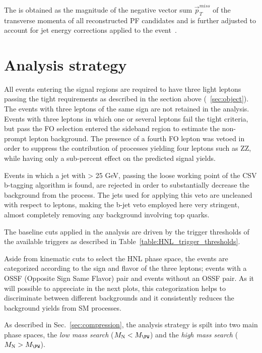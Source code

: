 
The \ptmiss is obtained as the magnitude of the negative vector sum $\overrightarrow{p}_{T}^{miss}$ of the transverse momenta of 
all reconstructed PF candidates and is further adjusted to account for jet energy corrections applied to the event~\cite{CMS-PAS-JME-16-004}.

\section{Analysis strategy}\label{sec:analisi}
All events entering the signal regions are required to have three light leptons passing the tight requirements as described in the section above (~\ref{sec:object}).
The events with three leptons of the same sign are not retained in the analysis. 
Events with three leptons in which one or several leptons fail the tight criteria, but pass the FO selection entered the sideband region to estimate the non-prompt lepton background. The presence of a fourth FO lepton was vetoed in order to suppress the contribution of processes yielding four leptons such as ZZ, while having only a sub-percent effect on the predicted signal yields.

Events in which a jet with \pt > 25 GeV, passing the loose working point of the CSV b-tagging algorithm is found, are rejected in order to substantially decrease the background from the \ttbar process. The jets used for applying this veto are uncleaned with respect to leptons, making the b-jet veto employed here very stringent, almost completely removing any background involving top quarks. 

The baseline \pt cuts applied in the analysis are driven by the
trigger thresholds of the available triggers as described in
Table~\ref{table:HNL_trigger_thresholds}.

Aside from kinematic cuts to select the HNL phase space, the events
are categorized according to the sign and flavor of the three
leptons; events with a OSSF (Opposite Sign Same Flavor) pair and
events without an OSSF pair. As it will possible to appreciate in the
next plots, this categorization helps to discriminate between
different backgrounds and it consistently reduces the background yields
from SM processes.

As described in Sec.~\ref{sec:compression}, the analysis
strategy is spilt into two main phase spaces, the \emph{low mass search} ($M_\hnl <
M_\PW$) and the \emph{high mass search} ($M_\hnl > M_\PW$).

